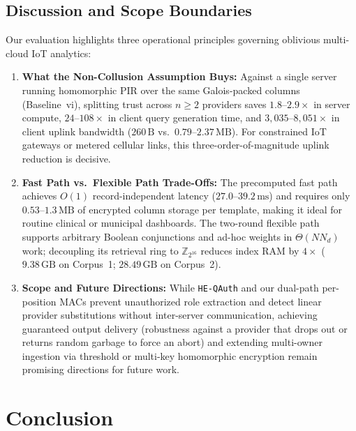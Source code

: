 \documentclass[11pt,a4paper]{article}
\begin{document}
\subsection{Discussion and Scope Boundaries}\label{sec:discussion}

Our evaluation highlights three operational principles governing oblivious multi-cloud IoT analytics:
\begin{enumerate}\setlength{\itemsep}{2pt}\setlength{\parskip}{0pt}
    \item \textbf{What the Non-Collusion Assumption Buys:} Against a single server running homomorphic PIR over the same Galois-packed columns (Baseline~vi), splitting trust across $n \ge 2$ providers saves $1.8\text{--}2.9\times$ in server compute, $24\text{--}108\times$ in client query generation time, and $3{,}035\text{--}8{,}051\times$ in client uplink bandwidth ($260\,\text{B}$ vs.\ $0.79\text{--}2.37\,\text{MB}$). For constrained IoT gateways or metered cellular links, this three-order-of-magnitude uplink reduction is decisive.
    \item \textbf{Fast Path vs.\ Flexible Path Trade-Offs:} The precomputed fast path achieves $O(1)$ record-independent latency ($27.0\text{--}39.2\,\text{ms}$) and requires only $0.53\text{--}1.3\,\text{MB}$ of encrypted column storage per template, making it ideal for routine clinical or municipal dashboards. The two-round flexible path supports arbitrary Boolean conjunctions and ad-hoc weights in $\Theta(N N_d)$ work; decoupling its retrieval ring to $\mathbb{Z}_{2^{16}}$ reduces index RAM by $4\times$ ($9.38\,\text{GB}$ on Corpus~1; $28.49\,\text{GB}$ on Corpus~2).
    \item \textbf{Scope and Future Directions:} While \texttt{HE-QAuth} and our dual-path per-position MACs prevent unauthorized role extraction and detect linear provider substitutions without inter-server communication, achieving guaranteed output delivery (robustness against a provider that drops out or returns random garbage to force an abort) and extending multi-owner ingestion via threshold or multi-key homomorphic encryption remain promising directions for future work.
\end{enumerate}

\section{Conclusion}\label{sec:conclusion}
\end{document}
